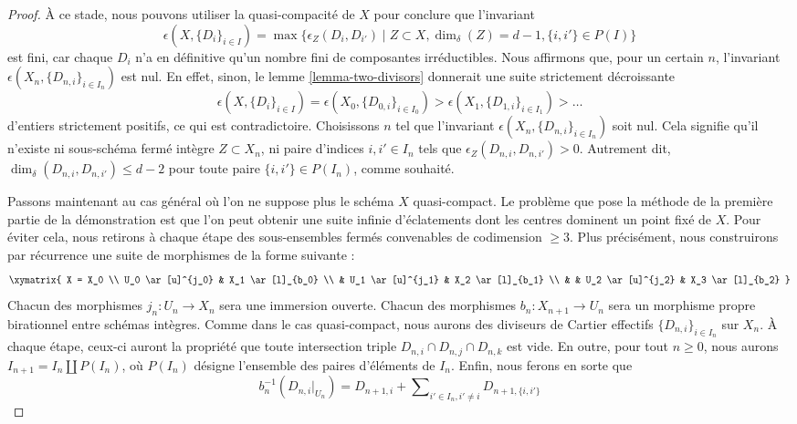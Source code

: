 \begin{proof}
\medskip\noindent
À ce stade, nous pouvons utiliser la quasi-compacité de $X$
pour conclure que l'invariant
\begin{equation}
\label{equation-invariant}
\epsilon(X, \{D_i\}_{i \in I}) =
\max\{\epsilon_Z(D_i, D_{i'}) \mid
Z \subset X,
\dim_\delta(Z) = d - 1,
\{i, i'\} \in P(I)\}
\end{equation}
est fini, car chaque $D_i$ n'a en définitive qu'un nombre fini de composantes
irréductibles. Nous affirmons que, pour un certain $n$, l'invariant
$\epsilon(X_n, \{D_{n, i}\}_{i \in I_n})$ est nul. En effet, sinon,
le lemme \ref{lemma-two-divisors} donnerait une suite strictement décroissante
$$
\epsilon(X, \{D_i\}_{i \in I})
=
\epsilon(X_0, \{D_{0, i}\}_{i \in I_0})
>
\epsilon(X_1, \{D_{1, i}\}_{i \in I_1})
>
\ldots
$$
d'entiers strictement positifs, ce qui est contradictoire. Choisissons $n$ tel que
l'invariant $\epsilon(X_n, \{D_{n, i}\}_{i \in I_n})$ soit nul.
Cela signifie qu'il n'existe ni sous-schéma fermé intègre $Z \subset X_n$,
ni paire d'indices $i, i' \in I_n$
tels que $\epsilon_Z(D_{n, i}, D_{n, i'}) > 0$.
Autrement dit, $\dim_\delta(D_{n, i}, D_{n, i'}) \leq d - 2$ pour
toute paire $\{i, i'\} \in P(I_n)$, comme souhaité.

\medskip\noindent
Passons maintenant au cas général où l'on ne suppose plus
le schéma $X$ quasi-compact. Le problème que pose la méthode de
la première partie de la démonstration est que l'on peut obtenir une suite infinie
d'éclatements dont les centres dominent un point fixé de $X$. Pour
éviter cela, nous retirons à chaque étape des sous-ensembles fermés convenables de codimension $\geq 3$.
Plus précisément, nous construirons par récurrence
une suite de morphismes de la forme suivante :
$$
\xymatrix{
X = X_0 \\
U_0 \ar[u]^{j_0} & X_1 \ar[l]_{b_0} \\
 & U_1 \ar[u]^{j_1} & X_2 \ar[l]_{b_1} \\
 & & U_2 \ar[u]^{j_2} & X_3 \ar[l]_{b_2}
}
$$
Chacun des morphismes $j_n : U_n \to X_n$ sera une immersion ouverte.
Chacun des morphismes $b_n : X_{n + 1} \to U_n$ sera un morphisme propre
birationnel entre schémas intègres. Comme dans le cas quasi-compact, nous aurons
des diviseurs de Cartier effectifs $\{D_{n, i}\}_{i \in I_n}$ sur $X_n$.
À chaque étape, ceux-ci auront la propriété que toute intersection triple
$D_{n, i} \cap D_{n, j} \cap D_{n, k}$ est vide.
En outre, pour tout $n \geq 0$, nous aurons
$I_{n + 1} = I_n \amalg P(I_n)$, où $P(I_n)$ désigne
l'ensemble des paires d'éléments de $I_n$.
Enfin, nous ferons en sorte que
$$
b_n^{-1}(D_{n, i}|_{U_n}) = D_{n + 1, i} +
\sum\nolimits_{i' \in I_n, i' \not = i} D_{n + 1, \{i, i'\}}
$$


\end{proof}
